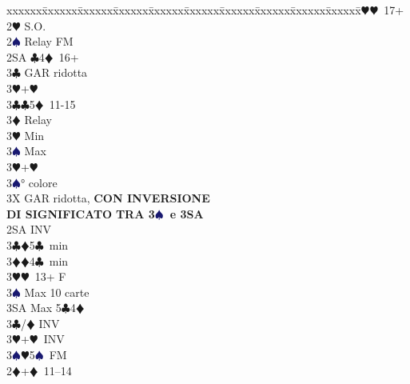 \documentclass[a4paper,italian]{article}
\newcommand{\BC}{\textcolor{OliveGreen}{$\clubsuit$}}
\newcommand{\BD}{\textcolor{RedOrange}{$\vardiamondsuit$}}
\newcommand{\BH}{\textcolor{Red2}{$\varheartsuit${}}}
\newcommand{\BS}{\textcolor{MidnightBlue}{$\spadesuit${}}}
\newenvironment{bidtable}
{\begin{tabbing}

    xxxxxx\=xxxxxx\=xxxxxx\=xxxxxx\=xxxxxx\=xxxxxx\=xxxxxx\=xxxxxx\=xxxxxx\=xxxxxx\=\kill}
{\end{tabbing} }%
\begin{document}
\begin{multicols}{2}
\begin{bidtable}
                                            3\BH {}\BH\ 17+\-\\
                                            2\BH \> S.O.\\
                                            2\BS \> Relay FM\+\\
                                            2SA \BC 4\BD\ 16+\+\\
                                            3\BC \> GAR ridotta\\
                                            3\BH {}+\BH \-\\
                                            3\BC {}\BC 5\BD\ 11-15\+\\
                                            3\BD \> Relay\+\\
                                            3\BH \> Min\\
                                            3\BS \> Max\-\\
                                            3\BH {}+\BH \\
                                            3\BS {}° colore\-\\
                                            3X \> GAR ridotta, \textbf{CON INVERSIONE}\+\\
                                            \textbf{DI SIGNIFICATO}
                                            \textbf{TRA 3\BS\ e 3SA}\-\-\\
                                            2SA \> INV\+\\
                                            3\BC {}\BD 5\BC\ min\\
                                            3\BD {}\BD 4\BC\ min\\
                                            3\BH {}\BH\ 13+ F\\
                                            3\BS \> Max 10 carte\\
                                            3SA \> Max 5\BC 4\BD \-\\
                                            3\BC/\BD \> INV\\
                                            3\BH {}+\BH\ INV\\
                                            3\BS {}\BH 5\BS\ FM\-\\
                                            2\BD {}+\BD\ 11--14\+\\

\end{bidtable}
\end{multicols}
\end{document}
